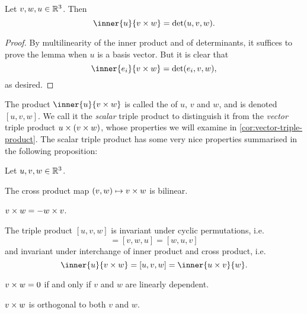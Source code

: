 \begin{lemma}
    \label{lem:cross-product-determinant}
    Let $v,w,u \in \mathbb{R}^3$. Then
    \begin{equation*}
        \inner{u}{v \crossp w}
            = \det(u,v,w).
    \end{equation*}
\end{lemma}

\begin{proof}
    By multilinearity of the inner product and of determinants, it suffices to prove the lemma when $u$ is a basis vector. But it is clear that
    \begin{equation*}
        \inner{e_i}{v \crossp w}
            = \det(e_i,v,w),
    \end{equation*}
    as desired.
\end{proof}
%
The product $\inner{u}{v \crossp w}$ is called the  of $u$, $v$ and $w$, and is denoted $[u,v,w]$. We call it the \emph{scalar} triple product to distinguish it from the \emph{vector} triple product $u \times (v \times w)$, whose properties we will examine in \cref{cor:vector-triple-product}. The scalar triple product has some very nice properties summarised in the following proposition:

\begin{proposition}
    Let $u,v,w \in \mathbb{R}^3$.
    \begin{enumproposition}
        \item The cross product map $(v,w) \mapsto v \times w$ is bilinear.

        \item $v \times w = - w \times v$.

        \item The triple product $[u,v,w]$ is invariant under cyclic permutations, i.e.
        \begin{equation*}
            [u,v,w]
                = [v,w,u]
                = [w,u,v]
        \end{equation*}
        and invariant under interchange of inner product and cross product, i.e.
        \begin{equation*}
            \inner{u}{v \crossp w}
                = [u,v,w]
                = \inner{u \crossp v}{w}.
        \end{equation*}

        \item $v \times w = 0$ if and only if $v$ and $w$ are linearly dependent.

        \item $v \times w$ is orthogonal to both $v$ and $w$.
    \end{enumproposition}
\end{proposition}

